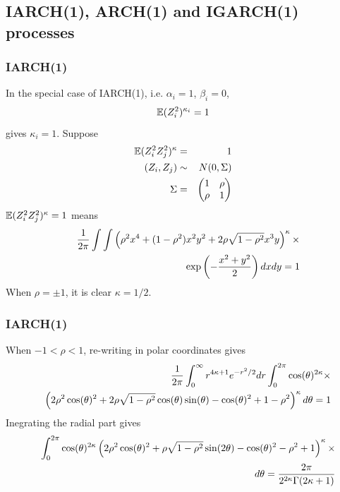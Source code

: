 \documentclass{beamer}
\begin{document}



\subsection{IARCH(1), ARCH(1) and IGARCH(1) processes}
\begin{frame}
  \frametitle{IARCH(1)}
  In the special case of IARCH(1), i.e. $\alpha_{i} = 1$, $\beta_{i} = 0$,
  \[
  \mathbb{E} (Z_i^2)^{\kappa_i} = 1
  \]
  gives $\kappa_i = 1$. Suppose
  \begin{eqnarray*}
    \mathbb{E} (Z_i^2 Z_j^2)^\kappa &=& 1 \\
    (Z_i, Z_j) &\sim& N(0, \Sigma) \\
    \Sigma &=&
    \begin{pmatrix}
      1 & \rho \\
      \rho & 1
    \end{pmatrix}
  \end{eqnarray*}
  $\mathbb{E} (Z_i^2 Z_j^2)^\kappa = 1$ means
  \begin{eqnarray*}
    && {1 \over 2\pi}
    \int \int
    \left(
      \rho^2 x^4 + (1 - \rho^2) x^2 y^2 + 2 \rho \sqrt{1 - \rho^2} x^3 y
    \right)^\kappa \times \\
    &&
    \exp\left(
      -{x^2 + y^2 \over 2}
    \right)
    dx dy = 1
  \end{eqnarray*}
  When $\rho = \pm 1$, it is clear $\kappa = 1/2$.  
\end{frame}

\begin{frame}
  \frametitle{IARCH(1)}
  When $-1 < \rho < 1$, re-writing in polar coordinates gives
  \begin{eqnarray*}
    && {1 \over 2\pi} \int_0^{\infty} r^{4\kappa + 1} e^{-r^2 / 2} dr
    \int_{0}^{2\pi} \cos(\theta)^{2 \kappa} \times \\
    &&
    \left(
      2 \rho^2 \cos(\theta)^2
      + 2 \rho \sqrt{1 - \rho^2} \cos(\theta) \sin(\theta) - \cos(\theta)^2 + 1 - \rho^2
    \right)^\kappa d\theta = 1
  \end{eqnarray*}
  Inegrating the radial part gives
  \begin{eqnarray*}
    && \int_{0}^{2\pi}
    \cos(\theta)^{2\kappa}
    \left(
      2 \rho^2 \cos(\theta)^2 + \rho \sqrt{1 - \rho^2} \sin(2\theta) - \cos(\theta)^2 - \rho^2 + 1
    \right)^\kappa \times \\
    && d\theta
    = {2 \pi
      \over
      2^{2 \kappa} \Gamma(2\kappa + 1)
    }
  \end{eqnarray*}
\end{frame}
\end{document}
